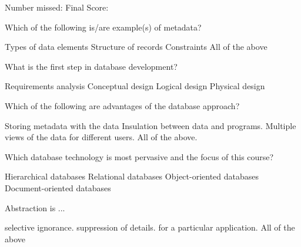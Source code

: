 \documentclass[9pt]{exam}
\begin{document}
\fi

\vspace{.5in}

Number missed: \makebox[.5in]{\hrulefill} Final Score: \makebox[.5in]{\hrulefill}

\newpage


\pointsinmargin
\bracketedpoints

\marginpointname{}

\begin{questions}


\question[4] Which of the following is/are example(s) of metadata?

\begin{choices}
\choice Types of data elements
\choice Structure of records
\choice Constraints
\correctchoice All of the above
\end{choices}

\question[4] What is the first step in database development?

\begin{choices}
\correctchoice Requirements analysis
\choice Conceptual design
\choice Logical design
\choice Physical design
\end{choices}

\question[4] Which of the following are advantages of the database approach?

\begin{choices}
\choice Storing metadata with the data
\choice Insulation between data and programs.
\choice Multiple views of the data for different users.
\correctchoice All of the above.
\end{choices}

\question[4] Which database technology is most pervasive and the focus of this course?

\begin{choices}
\choice Hierarchical databases
\correctchoice Relational databases
\choice Object-oriented databases
\choice Document-oriented databases
\end{choices}

\question[4] Abstraction is ...

\begin{choices}
\choice selective ignorance.
\choice suppression of details.
\choice for a particular application.
\correctchoice All of the above
\end{choices}


\end{questions}
\end{document}
